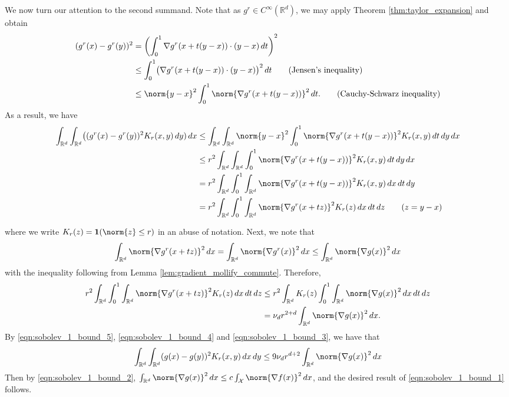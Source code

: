 \documentclass{article}
\newcommand{\Reals}{\mathbb{R}}
\newcommand{\1}{\mathbf{1}}
\newcommand{\Rd}{\Reals^d}
\newcommand{\Xset}{\mathcal{X}}
\theoremstyle{alden}
\theoremstyle{aldenthm}
\theoremstyle{definition}
\theoremstyle{remark}
\begin{document}
We now turn our attention to the second summand. Note that as $g^r \in C^{\infty}(\Rd)$, we may apply Theorem \ref{thm:taylor_expansion} and obtain
\begin{align*}
(g^r(x) - g^r(y))^2 & = \left(\int_{0}^{1} \nabla g^r(x + t(y - x)) \cdot (y - x) \,dt\right)^2 \\
& \leq \int_{0}^{1} \bigl(\nabla g^r(x + t(y - x)) \cdot (y - x)\bigr)^2 \,dt  \tag{Jensen's inequality} \\
& \leq \norm{y - x}^2 \int_{0}^{1} \norm{\nabla g^r(x + t(y - x))}^2 \,dt. \tag{Cauchy-Schwarz inequality}
\end{align*}
As a result, we have
\begin{align*}
\int_{\Rd} \int_{\Rd} \bigl((g^r(x) - g^r(y))^2 K_r(x,y) \,dy) \,dx & \leq \int_{\Rd} \int_{\Rd} \norm{y - x}^2  \int_{0}^{1} \norm{\nabla g^r(x + t(y - x))}^2 K_r(x,y) \,dt \,dy \,dx \\
& \leq r^{2} \int_{\Rd} \int_{\Rd} \int_{0}^{1} \norm{\nabla g^r(x + t(y - x))}^2 K_r(x,y) \,dt \,dy \,dx \\
& = r^{2} \int_{\Rd} \int_{0}^{1} \int_{\Rd} \norm{\nabla g^r(x + t(y - x))}^2 K_r(x,y) \,dx \,dt \,dy \\
& = r^{2} \int_{\Rd} \int_{0}^{1} \int_{\Rd} \norm{\nabla g^r(x + tz)}^2 K_r(z) \,dx \,dt \,dz \tag{$z = y - x$}
\end{align*}

where we write $K_r(z) = \mathbf{1}(\norm{z} \leq r)$ in an abuse of notation. Next, we note that
\begin{equation*}
\int_{\Rd} \norm{\nabla g^r(x + tz)}^2 \,dx = \int_{\Rd} \norm{\nabla g^r(x)}^2 \,dx \leq \int_{\Rd} \norm{\nabla g(x)}^2 \,dx
\end{equation*}
with the inequality following from Lemma \ref{lem:gradient_mollify_commute}. Therefore,
\begin{align}
r^{2} \int_{\Rd} \int_{0}^{1} \int_{\Rd} \norm{\nabla g^r(x + tz)}^2 K_r(z) \,dx \,dt \,dz & \leq r^{2} \int_{\Rd} K_r(z) \int_{0}^{1} \int_{\Rd} \norm{\nabla g(x)}^2 \,dx  \,dt \,dz \nonumber \\
& = \nu_d r^{2 + d} \int_{\Rd} \norm{\nabla g(x)}^2 \,dx. \label{eqn:sobolev_1_bound_3}
\end{align}
By \eqref{eqn:sobolev_1_bound_5}, \eqref{eqn:sobolev_1_bound_4} and \eqref{eqn:sobolev_1_bound_3}, we have that 
\begin{equation*}
\int_{\Rd} \int_{\Rd} (g(x) - g(y))^2 K_r(x,y) \,dx \,dy \leq 9 \nu_d r^{d + 2} \int_{\Rd} \norm{\nabla g(x)}^2 \,dx
\end{equation*}
Then by \ref{eqn:sobolev_1_bound_2}, $\int_{\Rd} \norm{\nabla g(x)}^2 \,dx \leq c \int_{\Xset} \norm{\nabla f(x)}^2 \,dx$, and the desired result of \eqref{eqn:sobolev_1_bound_1} follows.
\end{document}
